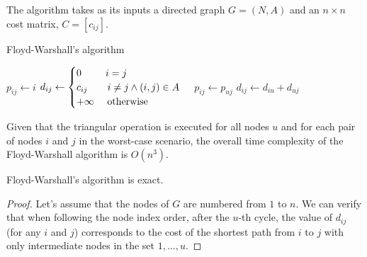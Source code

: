 The algorithm takes as its inputs a directed graph $G = (N,A)$ and an $n \times n$ cost matrix, $C = [c_{ij}]$.
\begin{algorithm}[H]
    \caption{Floyd-Warshall's algorithm}
        \begin{algorithmic}[1]
                    \State $p_{ij} \leftarrow i$
                    \State $d_{ij} \leftarrow \begin{cases}
                        0 \:\:\:\:\:\:\:\:\:\:\: i = j \\
                        c_{ij} \:\:\:\:\:\:\:\:\: i \neq j \land (i,j) \in A \\
                        +\infty \:\:\:\:\:\: \textnormal{otherwise}
                    \end{cases}$
                \EndFor
            \EndFor
                            \State $p_{ij} \leftarrow p_{uj}$
                            \State $d_{ij} \leftarrow d_{iu}+d_{uj}$
                        \EndIf
                    \EndFor
                \EndFor
                        \State \Return
                    \EndIf
                \EndFor
            \EndFor
        \end{algorithmic}
\end{algorithm}
Given that the triangular operation is executed for all nodes $u$ and for each pair of nodes $i$ and $j$ in the worst-case scenario, the overall time complexity of the Floyd-Warshall algorithm is $O(n^3)$.
\begin{proposition}
    Floyd-Warshall's algorithm is exact. 
\end{proposition}
\begin{proof}
    Let's assume that the nodes of $G$ are numbered from $1$ to $n$. 
    We can verify that when following the node index order, after the $u$-th cycle, the value of $d_{ij}$ (for any $i$ and $j$) corresponds to the cost of the shortest path from $i$ to $j$ with only intermediate nodes in the set ${1,\dots,u}$. 
\end{proof}

